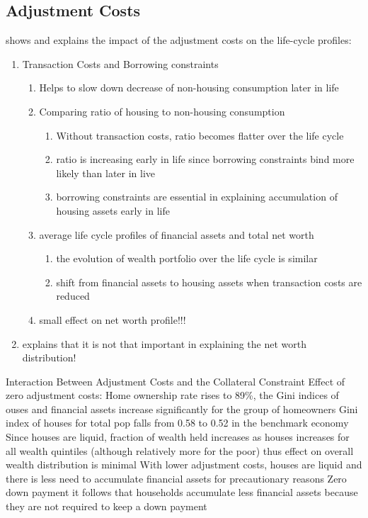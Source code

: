 \documentclass[a4paper,12pt]{article}
\begin{document}
\subsection{Adjustment Costs}
\cite{yang2009} shows and explains the impact of the adjustment costs on the life-cycle profiles: 
\begin{enumerate}
\item Transaction Costs and Borrowing constraints
\begin{enumerate}
\item Helps to slow down decrease of non-housing consumption later in life
\item Comparing ratio of housing to non-housing consumption
\begin{enumerate}
\item Without transaction costs, ratio becomes flatter over the life cycle 
\item ratio is increasing early in life since borrowing constraints bind more likely than later in live
\item borrowing constraints are essential in explaining accumulation of housing assets early in life
\end{enumerate}
\item average life cycle profiles of financial assets and total net worth
\begin{enumerate}
\item the evolution of wealth portfolio over the life cycle is similar
\item shift from financial assets to housing assets when transaction costs are reduced 
\end{enumerate}
\item small effect on net worth profile!!!
\end{enumerate}
\item explains that it is not that important in explaining the net worth distribution! 
\end{enumerate}


\cite{diaz2010}
Interaction Between Adjustment Costs and the Collateral Constraint
Effect of zero adjustment costs:
Home ownership rate rises to 89\%, the Gini indices of ouses and financial assets increase significantly for the group of homeowners
Gini index of houses for total pop falls from 0.58 to 0.52 in the benchmark economy
Since houses are liquid, fraction of wealth held increases as houses increases for all wealth quintiles (although relatively more for the poor)  thus effect on overall wealth distribution is minimal 
With lower adjustment costs, houses are liquid and there is less need to accumulate financial assets for precautionary reasons
Zero down payment it follows that households accumulate less financial assets because they are not required to keep a down payment 
\end{document}
